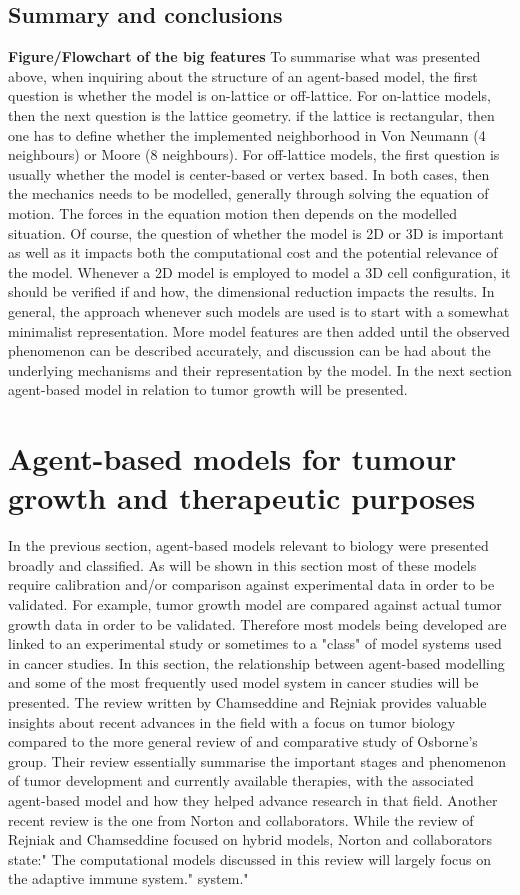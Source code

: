 \documentclass[11pt,a4paper]{article}
\begin{document}
\subsection{Summary and conclusions}
\textbf{Figure/Flowchart of the big features}
To summarise what was presented above, when inquiring about the structure of an agent-based model, the first question is whether the model is on-lattice or off-lattice. For on-lattice models, then the next question is the lattice geometry. if the lattice is rectangular, then one has to define whether the implemented neighborhood in Von Neumann (4 neighbours) or Moore (8 neighbours). For off-lattice models, the first question is usually whether the model is center-based or vertex based. In both cases, then the mechanics needs to be modelled, generally through solving the equation of motion. The forces in the equation motion then depends on the modelled situation. Of course, the question of whether the model is 2D or 3D is important as well as it impacts both the computational cost and the potential relevance of the model. Whenever a 2D model is employed to model a 3D cell configuration, it should be verified if and how, the dimensional reduction impacts the results. In general, the approach whenever such models are used is to start with a somewhat minimalist representation. More model features are then added until the observed phenomenon can be described accurately, and discussion can be had about the underlying mechanisms and their representation by the model. In the next section agent-based model in relation to tumor growth will be presented.

\section{Agent-based models for tumour growth and therapeutic purposes}
In the previous section, agent-based models relevant to biology were presented broadly and classified. As will be shown in this section most of these models require calibration and/or comparison against experimental data in order to be validated. For example, tumor growth model are compared against actual tumor growth data in order to be validated. Therefore most models being developed are linked to an experimental study or sometimes to a "class" of model systems used in cancer studies. In this section, the relationship between agent-based modelling and some of the most frequently used model system in cancer studies will be presented. The review written by Chamseddine and Rejniak provides valuable insights about recent advances in the field with a focus on tumor biology compared to the more general review of and comparative study of Osborne's group.\cite{Chamseddine2019} Their review essentially summarise the important stages and phenomenon of tumor development and currently available therapies, with the associated agent-based model and how they helped advance research in that field. Another recent review is the one from Norton and collaborators.\cite{Norton2019} While the review of Rejniak and Chamseddine focused on hybrid models, Norton and collaborators state:" The computational models discussed in this review will largely focus on the adaptive immune system."
system."
\end{document}
